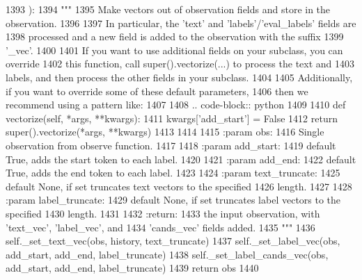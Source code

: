 \begin{DoxyCode}
1393     ):
1394         \textcolor{stringliteral}{"""}
1395 \textcolor{stringliteral}{        Make vectors out of observation fields and store in the observation.}
1396 \textcolor{stringliteral}{}
1397 \textcolor{stringliteral}{        In particular, the 'text' and 'labels'/'eval\_labels' fields are}
1398 \textcolor{stringliteral}{        processed and a new field is added to the observation with the suffix}
1399 \textcolor{stringliteral}{        '\_vec'.}
1400 \textcolor{stringliteral}{}
1401 \textcolor{stringliteral}{        If you want to use additional fields on your subclass, you can override}
1402 \textcolor{stringliteral}{        this function, call super().vectorize(...) to process the text and}
1403 \textcolor{stringliteral}{        labels, and then process the other fields in your subclass.}
1404 \textcolor{stringliteral}{}
1405 \textcolor{stringliteral}{        Additionally, if you want to override some of these default parameters,}
1406 \textcolor{stringliteral}{        then we recommend using a pattern like:}
1407 \textcolor{stringliteral}{}
1408 \textcolor{stringliteral}{        .. code-block:: python}
1409 \textcolor{stringliteral}{}
1410 \textcolor{stringliteral}{          def vectorize(self, *args, **kwargs):}
1411 \textcolor{stringliteral}{              kwargs['add\_start'] = False}
1412 \textcolor{stringliteral}{              return super().vectorize(*args, **kwargs)}
1413 \textcolor{stringliteral}{}
1414 \textcolor{stringliteral}{}
1415 \textcolor{stringliteral}{        :param obs:}
1416 \textcolor{stringliteral}{            Single observation from observe function.}
1417 \textcolor{stringliteral}{}
1418 \textcolor{stringliteral}{        :param add\_start:}
1419 \textcolor{stringliteral}{            default True, adds the start token to each label.}
1420 \textcolor{stringliteral}{}
1421 \textcolor{stringliteral}{        :param add\_end:}
1422 \textcolor{stringliteral}{            default True, adds the end token to each label.}
1423 \textcolor{stringliteral}{}
1424 \textcolor{stringliteral}{        :param text\_truncate:}
1425 \textcolor{stringliteral}{            default None, if set truncates text vectors to the specified}
1426 \textcolor{stringliteral}{            length.}
1427 \textcolor{stringliteral}{}
1428 \textcolor{stringliteral}{        :param label\_truncate:}
1429 \textcolor{stringliteral}{            default None, if set truncates label vectors to the specified}
1430 \textcolor{stringliteral}{            length.}
1431 \textcolor{stringliteral}{}
1432 \textcolor{stringliteral}{        :return:}
1433 \textcolor{stringliteral}{            the input observation, with 'text\_vec', 'label\_vec', and}
1434 \textcolor{stringliteral}{            'cands\_vec' fields added.}
1435 \textcolor{stringliteral}{        """}
1436         self.\_set\_text\_vec(obs, history, text\_truncate)
1437         self.\_set\_label\_vec(obs, add\_start, add\_end, label\_truncate)
1438         self.\_set\_label\_cands\_vec(obs, add\_start, add\_end, label\_truncate)
1439         \textcolor{keywordflow}{return} obs
1440 
\end{DoxyCode}
